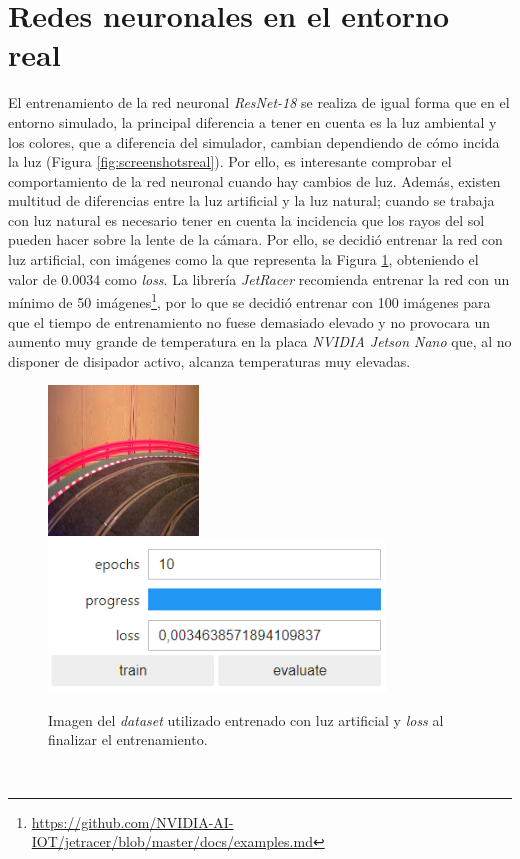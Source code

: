 \section{Redes neuronales en el entorno real}
El entrenamiento de la red neuronal \textit{ResNet-18} se realiza de igual forma que en el entorno simulado, la principal diferencia a tener en cuenta es la luz ambiental y los colores, que a diferencia del simulador, cambian dependiendo de cómo incida la luz (Figura \ref{fig:screenshotsreal}). Por ello, es interesante comprobar el comportamiento de la red neuronal cuando hay cambios de luz. Además, existen multitud de diferencias entre la luz artificial y la luz natural; cuando se trabaja con luz natural es necesario tener en cuenta la incidencia que los rayos del sol pueden hacer sobre la lente de la cámara. Por ello, se decidió entrenar la red con luz artificial, con imágenes como la que representa la Figura \ref{fig:imagedataset}, obteniendo el valor de 0.0034 como \textit{loss}. La librería \textit{JetRacer} recomienda entrenar la red con un mínimo de 50 imágenes\footnote{\url{https://github.com/NVIDIA-AI-IOT/jetracer/blob/master/docs/examples.md}}, por lo que se decidió entrenar con 100 imágenes para que el tiempo de entrenamiento no fuese demasiado elevado y no provocara un aumento muy grande de temperatura en la placa \textit{NVIDIA Jetson Nano} que, al no disponer de disipador activo, alcanza temperaturas muy elevadas.\\

\begin{figure} [h!]
	\begin{center}
		\includegraphics[height=4cm]{figs/imagedataset}\hspace{1cm}\includegraphics[height=4cm]{figs/epoch}
	\end{center}
	\caption{Imagen del \textit{dataset} utilizado entrenado con luz artificial y \textit{loss} al finalizar el entrenamiento.}
	\label{fig:imagedataset}
\end{figure}\

